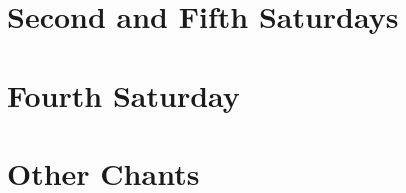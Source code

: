 \documentclass{kdo}
\begin{document}
\chapter{Second and Fifth Saturdays}
\paliRefuges
\makaHannyaHaramittaShingyo
\shosaimyoKichijoDharani
\harmonyOfDifferenceAndEquality
\ancestorsLong
\jiHoSan

\chapter{Fourth Saturday}
\paliRefuges
\makaHannyaHaramittaShingyo
\shosaimyoKichijoDharani
\lovingKindnessMeditation
\enmeiJukkuKannonGyo
\jiHoSan

\chapter{Other Chants}
\end{document}
